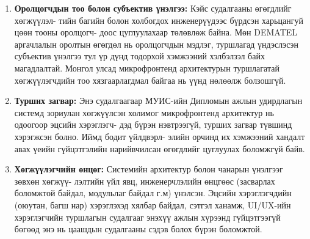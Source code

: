 \begin{enumerate}
    \item \textbf{Оролцогчдын тоо болон субъектив үнэлгээ:} Кэйс судалгааны өгөгдлийг хөгжүүлэл- тийн багийн болон холбогдох инженерүүдээс бүрдсэн харьцангуй цөөн тооны оролцогч- доос цуглуулахаар төлөвлөж байна. Мөн DEMATEL аргачлалын оролтын өгөгдөл нь оролцогчдын мэдлэг, туршлагад үндэслэсэн субъектив үнэлгээ тул үр дүнд тодорхой хэмжээний хэлбэлзэл байх магадлалтай. Монгол улсад микрофронтенд архитектурын туршлагатай хөгжүүлэгчдийн тоо хязгаарлагдмал байгаа нь үүнд нөлөөлж болзошгүй.
    
    \item \textbf{Турших загвар:} Энэ судалгаагаар МУИС-ийн Дипломын ажлын удирдлагын системд зориулан хөгжүүлсэн холимог микрофронтенд архитектур нь одоогоор эцсийн хэрэглэгч- дэд бүрэн нэвтрээгүй, турших загвар түвшинд хэрэгжсэн болно. Иймд бодит үйлдвэрл- элийн орчинд их хэмжээний хандалт авах үеийн гүйцэтгэлийн нарийвчилсан өгөгдлийг цуглуулах боломжгүй байв. 
    
    \item \textbf{Хөгжүүлэгчийн өнцөг:} Системийн архитектур болон чанарын үнэлгээг зөвхөн хөгжүү- лэлтийн үйл явц, инженерчлэлийн өнцгөөс (засварлах боломжтой байдал, модульлаг байдал г.м) үнэлсэн. Эцсийн хэрэглэгчдийн (оюутан, багш нар) хэрэглэхэд хялбар байдал, сэтгэл ханамж, UI/UX-ийн хэрэглэгчийн туршлагын судалгааг энэхүү ажлын хүрээнд гүйцэтгээгүй бөгөөд энэ нь цаашдын судалгааны сэдэв болох бүрэн боломжтой.
\end{enumerate}